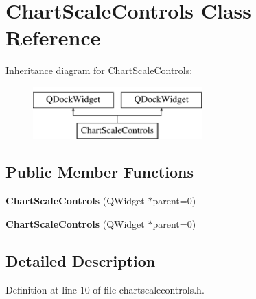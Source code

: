\hypertarget{class_chart_scale_controls}{}\section{Chart\+Scale\+Controls Class Reference}
\label{class_chart_scale_controls}
Inheritance diagram for Chart\+Scale\+Controls\+:\begin{figure}[H]
\begin{center}
\leavevmode
\includegraphics[height=2.000000cm]{class_chart_scale_controls}
\end{center}
\end{figure}
\subsection*{Public Member Functions}
\begin{DoxyCompactItemize}
\item 
{\bfseries Chart\+Scale\+Controls} (Q\+Widget $\ast$parent=0)\hypertarget{class_chart_scale_controls_a5ad4bd316f968267a8f2b9f9335b5814}{}\label{class_chart_scale_controls_a5ad4bd316f968267a8f2b9f9335b5814}

\item 
{\bfseries Chart\+Scale\+Controls} (Q\+Widget $\ast$parent=0)\hypertarget{class_chart_scale_controls_a5ad4bd316f968267a8f2b9f9335b5814}{}\label{class_chart_scale_controls_a5ad4bd316f968267a8f2b9f9335b5814}

\end{DoxyCompactItemize}


\subsection{Detailed Description}


Definition at line 10 of file chartscalecontrols.\+h.

